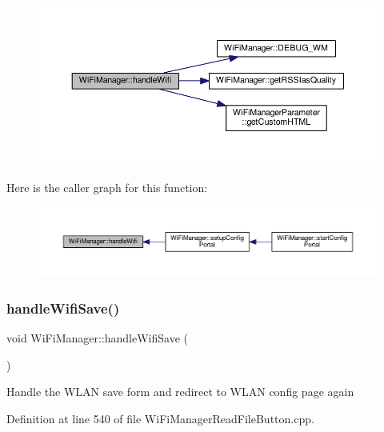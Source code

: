 \begin{figure}[H]
\begin{center}
\leavevmode
\includegraphics[width=350pt]{d4/dc8/class_wi_fi_manager_a57a9048175c1918340ab9d0a2c53601f_cgraph}
\end{center}
\end{figure}
Here is the caller graph for this function\+:\nopagebreak
\begin{figure}[H]
\begin{center}
\leavevmode
\includegraphics[width=350pt]{d4/dc8/class_wi_fi_manager_a57a9048175c1918340ab9d0a2c53601f_icgraph}
\end{center}
\end{figure}
\mbox{\label{class_wi_fi_manager_a2a8c2b60aa86dfdeab8a1a90f7122dc7}} 
\subsubsection{\texorpdfstring{handle\+Wifi\+Save()}{handleWifiSave()}}
{\footnotesize\ttfamily void Wi\+Fi\+Manager\+::handle\+Wifi\+Save (\begin{DoxyParamCaption}{ }\end{DoxyParamCaption})\hspace{0.3cm}{\ttfamily [private]}}

Handle the W\+L\+AN save form and redirect to W\+L\+AN config page again 

Definition at line 540 of file Wi\+Fi\+Manager\+Read\+File\+Button.\+cpp.


